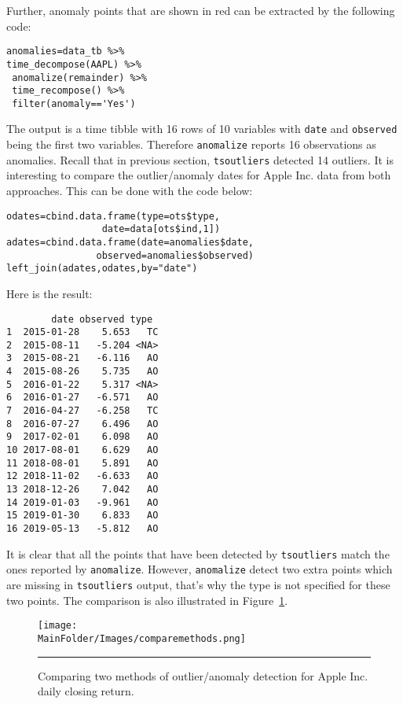 \afterpage{\FloatBarrier}
Further, anomaly points that are shown in red can be extracted by the following code:

\begin{verbatim}
anomalies=data_tb %>%  
time_decompose(AAPL) %>%  
 anomalize(remainder) %>%  
 time_recompose() %>%  
 filter(anomaly=='Yes')
\end{verbatim}

The output is a time tibble with 16 rows of 10 variables with \verb|date| and \verb|observed| being the first two variables. Therefore \verb|anomalize| reports 16 observations as anomalies. Recall that in previous section, \verb|tsoutliers| detected 14 outliers. It is interesting to compare the outlier/anomaly dates for Apple Inc. data from both approaches. This can be done with the code below:
\begin{lstlisting}
odates=cbind.data.frame(type=ots$type,
                 date=data[ots$ind,1])
adates=cbind.data.frame(date=anomalies$date,
                observed=anomalies$observed)
left_join(adates,odates,by="date")
\end{lstlisting}
Here is the result:
\begin{lstlisting}
        date observed type
1  2015-01-28    5.653   TC
2  2015-08-11   -5.204 <NA>
3  2015-08-21   -6.116   AO
4  2015-08-26    5.735   AO
5  2016-01-22    5.317 <NA>
6  2016-01-27   -6.571   AO
7  2016-04-27   -6.258   TC
8  2016-07-27    6.496   AO
9  2017-02-01    6.098   AO
10 2017-08-01    6.629   AO
11 2018-08-01    5.891   AO
12 2018-11-02   -6.633   AO
13 2018-12-26    7.042   AO
14 2019-01-03   -9.961   AO
15 2019-01-30    6.833   AO
16 2019-05-13   -5.812   AO
\end{lstlisting}
It is clear that all the points that have been detected by \verb|tsoutliers| match the ones reported by \verb|anomalize|. However, \verb|anomalize| detect two extra points which are missing in \verb|tsoutliers| output, that's why the type is not specified for these two points. The comparison is also illustrated in Figure~\ref{fig:comparemethods}.
\begin{figure}[t]
\centering
\texttt{[image: \\MainFolder/Images/comparemethods.png]}
\caption[\small Comparing two methods of outlier/anomaly detection for Apple Inc. daily closing return.]{\small Comparing two methods of outlier/anomaly detection for Apple Inc. daily closing return.}
\hrule\label{fig:comparemethods}
\end{figure}
\afterpage{\FloatBarrier}

